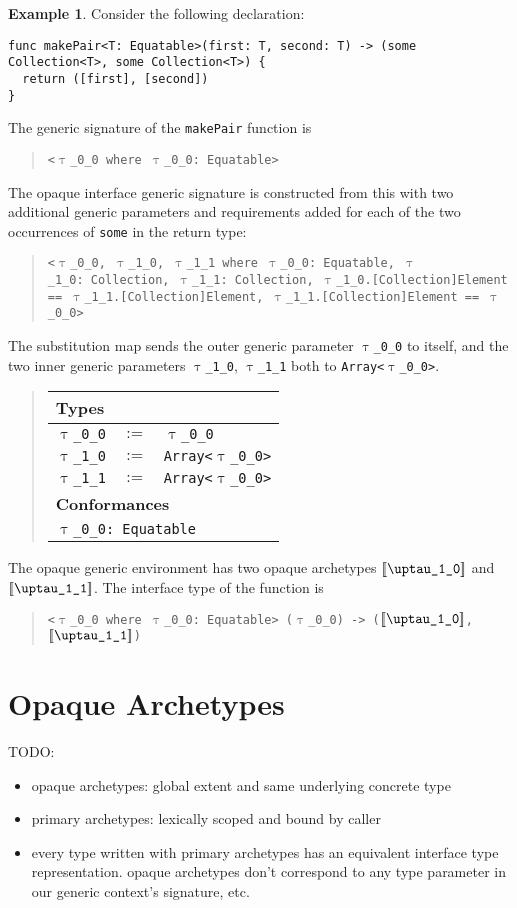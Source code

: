\documentclass[a4paper,headsepline,bibliography=totoc,toc=flat,fleqn,twoside=semi]{scrbook}
\theoremstyle{definition}
\theoremstyle{definition}
\newtheorem{example}{Example}[chapter]
\theoremstyle{definition}
\newcommand{\ttgp}[2]{\texttt{$\uptau$\_#1\_#2}}
\newcommand{\SubMapC}[2]{\begin{tabular}{|lll|}
\hline
\multicolumn{3}{|l|}{\textbf{Types}}\\
\hline
#1\\
\hline
\hline
\multicolumn{3}{|l|}{\textbf{Conformances}}\\
\hline
#2\\
\hline
\end{tabular}}
\newcommand{\SubType}[2]{\texttt{#1}&$:=$&\texttt{#2}}
\newcommand{\SubConf}[1]{\multicolumn{3}{|l|}{\texttt{#1}}}
\newcommand{\archetype}[1]{$[\![\texttt{#1}]\!]$}
\newcommand{\ifWIP}{\iffalse}
\begin{document}
\begin{example}
Consider the following declaration:
\begin{Verbatim}
func makePair<T: Equatable>(first: T, second: T) -> (some Collection<T>, some Collection<T>) {
  return ([first], [second])
}
\end{Verbatim}
The generic signature of the \texttt{makePair} function is
\begin{quote}
\texttt{<\ttgp{0}{0} where \ttgp{0}{0}:\ Equatable>}
\end{quote}

The opaque interface generic signature is constructed from this with two additional generic parameters and requirements added for each of the two occurrences of \texttt{some} in the return type:
\begin{quote}
\texttt{<\ttgp{0}{0}, \ttgp{1}{0}, \ttgp{1}{1} where \ttgp{0}{0}:\ Equatable, \ttgp{1}{0}:\ Collection, \ttgp{1}{1}:\ Collection, \ttgp{1}{0}.[Collection]Element == \ttgp{1}{1}.[Collection]Element, \ttgp{1}{1}.[Collection]Element == \ttgp{0}{0}>}
\end{quote}

The substitution map sends the outer generic parameter \ttgp{0}{0} to itself, and the two inner generic parameters \ttgp{1}{0}, \ttgp{1}{1} both to \texttt{Array<\ttgp{0}{0}>}.
\begin{quote}
\SubMapC{
\SubType{\ttgp{0}{0}}{\ttgp{0}{0}}\\
\SubType{\ttgp{1}{0}}{Array<\ttgp{0}{0}>}\\
\SubType{\ttgp{1}{1}}{Array<\ttgp{0}{0}>}
}{
\SubConf{\ttgp{0}{0}:\ Equatable}
}
\end{quote}
The opaque generic environment has two opaque archetypes \archetype{\ttgp{1}{0}} and \archetype{\ttgp{1}{1}}. The interface type of the function is
\begin{quote}
\texttt{<\ttgp{0}{0} where \ttgp{0}{0}:\ Equatable> (\ttgp{0}{0}) -> (\archetype{\ttgp{1}{0}}, \archetype{\ttgp{1}{1}})}
\end{quote}
\end{example}
\fi

\section{Opaque Archetypes}\label{opaquearchetype}

\ifWIP
TODO:
\begin{itemize}
\item opaque archetypes: global extent and same underlying concrete type 
\item primary archetypes: lexically scoped and bound by caller
\item every type written with primary archetypes has an equivalent interface type representation. opaque archetypes don't correspond to any type parameter in our generic context's signature, etc.
\end{itemize}
\end{document}
